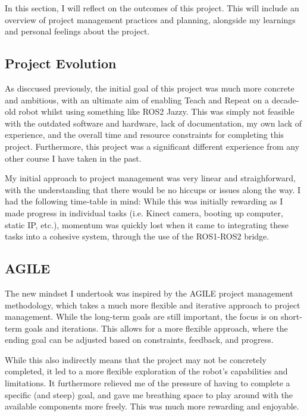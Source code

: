 \documentclass[a4paper, 12pt]{article}
\newif\ifshownotes
\newcommand{\notes}[1]{\ifshownotes\textcolor{blue}{#1}\fi}
\begin{document}
    \notes{draft 1, 11.05 6pm}

    In this section, I will reflect on the outcomes of this project. This will include an overview of project management practices and planning, alongside my learnings and personal feelings about the project. 

    \subsection{Project Evolution}

    As disccused previously, the initial goal of this project was much more concrete and ambitious, with an ultimate aim of enabling Teach and Repeat on a decade-old robot whilst using something like ROS2 Jazzy. This was simply not feasible with the outdated software and hardware, lack of documentation, my own lack of experience, and the overall time and resource constraints for completing this project. Furthermore, this project was a significant different experience from any other course I have taken in the past.
    
    My initial approach to project management was very linear and straighforward, with the understanding that there would be no hiccups or issues along the way. I had the following time-table in mind: \notes{maybe insert a table showcasing the plan here?} While this was initially rewarding as I made progress in individual tasks (i.e. Kinect camera, booting up computer, static IP, etc.), momentum was quickly lost when it came to integrating these tasks into a cohesive system, through the use of the ROS1-ROS2 bridge. 

    \subsection{AGILE}

    The new mindset I undertook was inspired by the AGILE project management methodology, which takes a much more flexible and iterative approach to project management. While the long-term goals are still important, the focus is on short-term goals and iterations. This allows for a more flexible approach, where the ending goal can be adjusted based on constraints, feedback, and progress. 

    While this also indirectly means that the project may not be concretely completed, it led to a more flexible exploration of the robot's capabilities and limitations. It furthermore relieved me of the pressure of having to complete a specific (and steep) goal, and gave me breathing space to play around with the available components more freely. This was much more rewarding and enjoyable.
\end{document}
